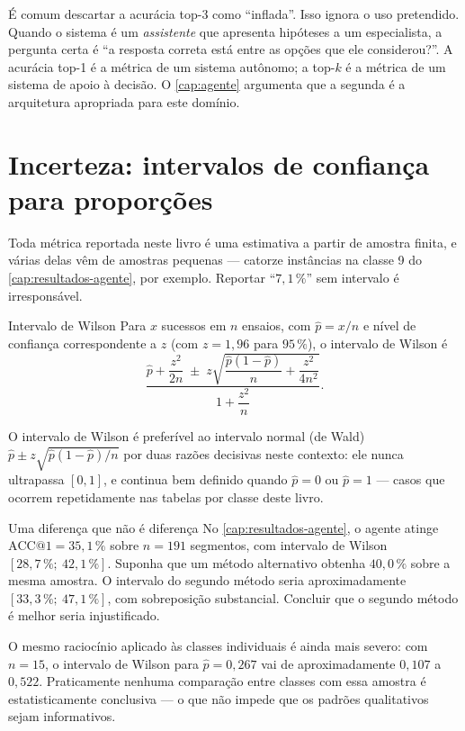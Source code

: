 \begin{destaque}
É comum descartar a acurácia top-3 como ``inflada''. Isso ignora o uso pretendido.
Quando o sistema é um \emph{assistente} que apresenta hipóteses a um especialista, a
pergunta certa é ``a resposta correta está entre as opções que ele considerou?''.
A acurácia top-1 é a métrica de um sistema autônomo; a top-$k$ é a métrica de um
sistema de apoio à decisão. O \cref{cap:agente} argumenta que a segunda é a arquitetura
apropriada para este domínio.
\end{destaque}

\section{Incerteza: intervalos de confiança para proporções}

Toda métrica reportada neste livro é uma estimativa a partir de amostra finita, e várias
delas vêm de amostras pequenas --- catorze instâncias na classe 9 do
\cref{cap:resultados-agente}, por exemplo. Reportar ``$7{,}1\,\%$'' sem intervalo é
irresponsável.

\begin{definicao}{Intervalo de Wilson}
Para $x$ sucessos em $n$ ensaios, com $\hat{p} = x/n$ e nível de confiança
correspondente a $z$ (com $z = 1{,}96$ para $95\,\%$), o intervalo de Wilson
\citep{Wilson1927} é
\begin{equation}
  \frac{\hat{p} + \dfrac{z^{2}}{2n} \;\pm\; z\sqrt{\dfrac{\hat{p}(1-\hat{p})}{n}
  + \dfrac{z^{2}}{4n^{2}}}}{1 + \dfrac{z^{2}}{n}}.
  \label{eq:wilson}
\end{equation}
\end{definicao}

O intervalo de Wilson é preferível ao intervalo normal (de Wald)
$\hat{p} \pm z\sqrt{\hat{p}(1-\hat{p})/n}$ por duas razões decisivas neste contexto:
ele nunca ultrapassa $[0,1]$, e continua bem definido quando $\hat{p} = 0$ ou
$\hat{p} = 1$ --- casos que ocorrem repetidamente nas tabelas por classe deste livro.

\begin{exemplo}{Uma diferença que não é diferença}
No \cref{cap:resultados-agente}, o agente atinge $\text{ACC}@1 = 35{,}1\,\%$ sobre
$n = 191$ segmentos, com intervalo de Wilson $[28{,}7\,\%;\ 42{,}1\,\%]$. Suponha que
um método alternativo obtenha $40{,}0\,\%$ sobre a mesma amostra. O intervalo do
segundo método seria aproximadamente $[33{,}3\,\%;\ 47{,}1\,\%]$, com sobreposição
substancial. Concluir que o segundo método é melhor seria injustificado.

O mesmo raciocínio aplicado às classes individuais é ainda mais severo: com $n = 15$,
o intervalo de Wilson para $\hat{p} = 0{,}267$ vai de aproximadamente $0{,}107$ a
$0{,}522$. Praticamente nenhuma comparação entre classes com essa amostra é
estatisticamente conclusiva --- o que não impede que os padrões qualitativos sejam
informativos.
\end{exemplo}

